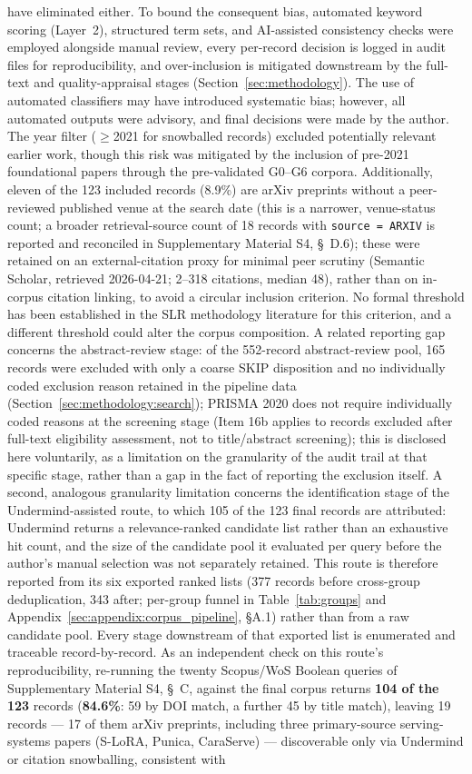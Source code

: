 have eliminated either. To bound the consequent bias, automated keyword scoring (Layer~2), structured term sets, and AI-assisted consistency checks were employed alongside manual review, every per-record decision is logged in audit files for reproducibility, and over-inclusion is mitigated downstream by the full-text and quality-appraisal stages (Section~\ref{sec:methodology}). The use of automated classifiers may have introduced systematic bias; however, all automated outputs were advisory, and final decisions were made by the author. The year filter ($\geq$2021 for snowballed records) excluded potentially relevant earlier work, though this risk was mitigated by the inclusion of pre-2021 foundational papers through the pre-validated G0--G6 corpora. Additionally, eleven of the 123 included records (8.9\%) are arXiv preprints without a peer-reviewed published venue at the search date (this is a narrower, venue-status count; a broader retrieval-source count of 18 records with \texttt{source = ARXIV} is reported and reconciled in Supplementary Material S4, \S~D.6); these were retained on an external-citation proxy for minimal peer scrutiny (Semantic Scholar, retrieved 2026-04-21; 2--318 citations, median 48), rather than on in-corpus citation linking, to avoid a circular inclusion criterion. No formal threshold has been established in the SLR methodology literature for this criterion, and a different threshold could alter the corpus composition. A related reporting gap concerns the abstract-review stage: of the 552-record abstract-review pool, 165 records were excluded with only a coarse SKIP disposition and no individually coded exclusion reason retained in the pipeline data (Section~\ref{sec:methodology:search}); PRISMA 2020 does not require individually coded reasons at the screening stage (Item 16b applies to records excluded after full-text eligibility assessment, not to title/abstract screening); this is disclosed here voluntarily, as a limitation on the granularity of the audit trail at that specific stage, rather than a gap in the fact of reporting the exclusion itself. A second, analogous granularity limitation concerns the identification stage of the Undermind-assisted route, to which 105 of the 123 final records are attributed: Undermind returns a relevance-ranked candidate list rather than an exhaustive hit count, and the size of the candidate pool it evaluated per query before the author's manual selection was not separately retained. This route is therefore reported from its six exported ranked lists (377 records before cross-group deduplication, 343 after; per-group funnel in Table~\ref{tab:groups} and Appendix~\ref{sec:appendix:corpus_pipeline}, \S A.1) rather than from a raw candidate pool. Every stage downstream of that exported list is enumerated and traceable record-by-record. As an independent check on this route's reproducibility, re-running the twenty Scopus/WoS Boolean queries of Supplementary Material S4, \S~C, against the final corpus returns \textbf{104 of the 123} records (\textbf{84.6\%}: 59 by DOI match, a further 45 by title match), leaving 19 records --- 17 of them arXiv preprints, including three primary-source serving-systems papers (S-LoRA, Punica, CaraServe) --- discoverable only via Undermind or citation snowballing, consistent with 